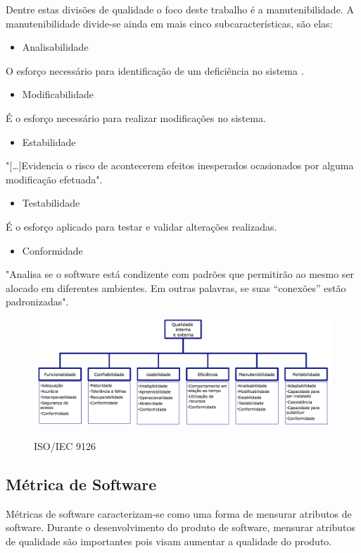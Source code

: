 Dentre estas divisões de qualidade o foco deste trabalho é a manutenibilidade. A manutenibilidade divide-se ainda em mais cinco subcaracterísticas, são elas:
\begin{itemize}
\item Analisabilidade
\end{itemize}
O esforço necessário para identificação de um deficiência no sistema \cite{isaias2012}.
\begin{itemize}
\item Modificabilidade
\end{itemize}
É o esforço necessário para realizar modificações no sistema.
\begin{itemize}
\item Estabilidade
\end{itemize}
"[\ldots]Evidencia  o  risco  de  acontecerem  efeitos inesperados ocasionados por alguma modificação efetuada"\space \cite[p.~29]{isaias2012}.
\begin{itemize}
\item Testabilidade
\end{itemize}
É o esforço aplicado para testar e validar alterações realizadas.
\begin{itemize}
\item Conformidade
\end{itemize}
"Analisa  se  o  software  está  condizente  com 
padrões  que  permitirão  ao  mesmo  ser  alocado  em  diferentes ambientes.  Em  outras  palavras,  se  suas  “conexões”  estão padronizadas"\space \cite[p.~29]{isaias2012}.
\begin{figure}[tbh]
\centering
\caption[ISO/IEC 9126]{ISO/IEC 9126}
\includegraphics[width=0.7\linewidth]{./images/iso9126}
\label{fig:ISO9126}
\end{figure}


\subsection{Métrica de Software}
Métricas de software caracterizam-se como uma forma de mensurar atributos de software. Durante o desenvolvimento do produto de software, mensurar atributos de qualidade são importantes pois visam aumentar a qualidade do produto.

